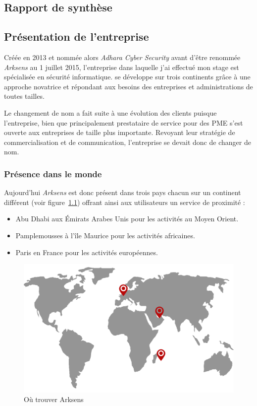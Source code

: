\documentclass[a4paper,10pt, twoside]{report}
\begin{document}
\begin{spacing}{1.2}
\chapter{Rapport de synth\`ese}
\thispagestyle{fancy}
\label{rapportSynthese}
\section{Pr\'esentation de l'entreprise}
Cr\'e\'ee en 2013 et nomm\'ee alors \textit{Adhara Cyber Security} avant
d'\^etre renomm\'ee \textit{Arksens} au 1 juillet 2015, l'entreprise 
dans laquelle j'ai effectu\'e mon stage est sp\'ecialis\'ee en s\'ecurit\'e
informatique. se d\'eveloppe sur trois continents gr\^ace \`a une approche
novatrice et r\'epondant aux besoins des entreprises et administrations de
toutes tailles.

Le changement de nom a fait suite \`a une \'evolution des clients puisque
l'entreprise, bien que principalement prestataire de service pour des PME
s'est ouverte aux entreprises de taille plus importante. Revoyant leur
strat\'egie de commercialisation et de communication, l'entreprise se devait
donc de changer de nom.

\subsection{Pr\'esence dans le monde}
Aujourd'hui \textit{Arksens} est donc pr\'esent dans trois pays chacun sur
un continent diff\'erent (voir figure~\ref{mapArksens}) offrant ainsi aux
utilisateurs un service de proximit\'e :
\begin{itemize}
  \item Abu Dhabi aux \'Emirats Arabes Unis pour les activit\'es au Moyen
  Orient.
  \item Pamplemousses à l’\^ile Maurice pour les activit\'es africaines.
  \item Paris en France pour les activit\'es européennes.
\end{itemize}

\begin{figure}[h!]
  \centering
  \includegraphics[scale=0.30]{map_arksens.png}
  \caption{\label{mapArksens} O\`u trouver Arksens}
\end{figure}
      

\end{spacing}
\end{document}
